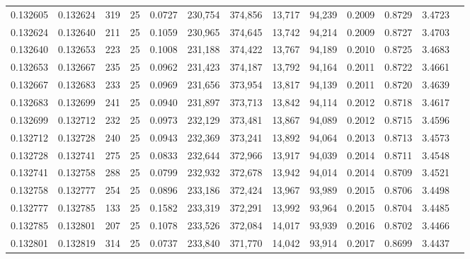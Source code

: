 \begin{tabular}{rrrrrrrrrrrrr}
0.132605 & 0.132624 &   319 &  25 &                                     0.0727 & 230,754 & 374,856 &  13,717 &  94,239 & 0.2009 & 0.8729 & 3.4723 \\
0.132624 & 0.132640 &   211 &  25 &                                     0.1059 & 230,965 & 374,645 &  13,742 &  94,214 & 0.2009 & 0.8727 & 3.4703 \\
0.132640 & 0.132653 &   223 &  25 &                                     0.1008 & 231,188 & 374,422 &  13,767 &  94,189 & 0.2010 & 0.8725 & 3.4683 \\
0.132653 & 0.132667 &   235 &  25 &                                     0.0962 & 231,423 & 374,187 &  13,792 &  94,164 & 0.2011 & 0.8722 & 3.4661 \\
0.132667 & 0.132683 &   233 &  25 &                                     0.0969 & 231,656 & 373,954 &  13,817 &  94,139 & 0.2011 & 0.8720 & 3.4639 \\
0.132683 & 0.132699 &   241 &  25 &                                     0.0940 & 231,897 & 373,713 &  13,842 &  94,114 & 0.2012 & 0.8718 & 3.4617 \\
0.132699 & 0.132712 &   232 &  25 &                                     0.0973 & 232,129 & 373,481 &  13,867 &  94,089 & 0.2012 & 0.8715 & 3.4596 \\
0.132712 & 0.132728 &   240 &  25 &                                     0.0943 & 232,369 & 373,241 &  13,892 &  94,064 & 0.2013 & 0.8713 & 3.4573 \\
0.132728 & 0.132741 &   275 &  25 &                                     0.0833 & 232,644 & 372,966 &  13,917 &  94,039 & 0.2014 & 0.8711 & 3.4548 \\
0.132741 & 0.132758 &   288 &  25 &                                     0.0799 & 232,932 & 372,678 &  13,942 &  94,014 & 0.2014 & 0.8709 & 3.4521 \\
0.132758 & 0.132777 &   254 &  25 &                                     0.0896 & 233,186 & 372,424 &  13,967 &  93,989 & 0.2015 & 0.8706 & 3.4498 \\
0.132777 & 0.132785 &   133 &  25 &                                     0.1582 & 233,319 & 372,291 &  13,992 &  93,964 & 0.2015 & 0.8704 & 3.4485 \\
0.132785 & 0.132801 &   207 &  25 &                                     0.1078 & 233,526 & 372,084 &  14,017 &  93,939 & 0.2016 & 0.8702 & 3.4466 \\
0.132801 & 0.132819 &   314 &  25 &                                     0.0737 & 233,840 & 371,770 &  14,042 &  93,914 & 0.2017 & 0.8699 & 3.4437 \\

\end{tabular}
